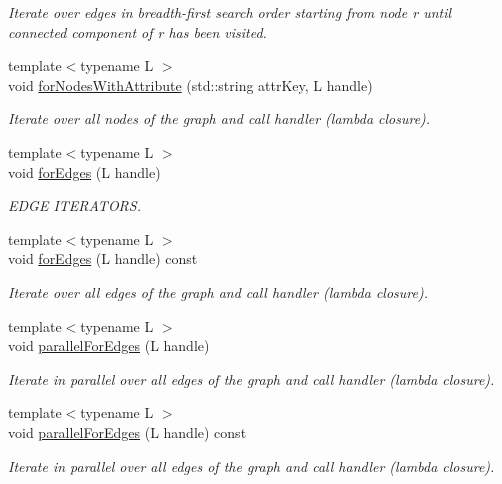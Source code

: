 \begin{DoxyCompactItemize}
\begin{DoxyCompactList}\small\item\em Iterate over edges in breadth-\/first search order starting from node r until connected component of r has been visited. \end{DoxyCompactList}\item 
{\footnotesize template$<$typename L $>$ }\\void \hyperlink{class_networ_kit_1_1_graph_ae182c231c108a4ff329f79e4eec28bc6}{for\-Nodes\-With\-Attribute} (std\-::string attr\-Key, L handle)
\begin{DoxyCompactList}\small\item\em Iterate over all nodes of the graph and call handler (lambda closure). \end{DoxyCompactList}\item 
{\footnotesize template$<$typename L $>$ }\\void \hyperlink{class_networ_kit_1_1_graph_a23a817e845887e6d2be9b42180448282}{for\-Edges} (L handle)
\begin{DoxyCompactList}\small\item\em E\-D\-G\-E I\-T\-E\-R\-A\-T\-O\-R\-S. \end{DoxyCompactList}\item 
{\footnotesize template$<$typename L $>$ }\\void \hyperlink{class_networ_kit_1_1_graph_a664cd528e003b9d530b9844412c9c243}{for\-Edges} (L handle) const 
\begin{DoxyCompactList}\small\item\em Iterate over all edges of the graph and call handler (lambda closure). \end{DoxyCompactList}\item 
{\footnotesize template$<$typename L $>$ }\\void \hyperlink{class_networ_kit_1_1_graph_a22c0e86e32fa99bb6f883bc63c42134a}{parallel\-For\-Edges} (L handle)
\begin{DoxyCompactList}\small\item\em Iterate in parallel over all edges of the graph and call handler (lambda closure). \end{DoxyCompactList}\item 
{\footnotesize template$<$typename L $>$ }\\void \hyperlink{class_networ_kit_1_1_graph_a107e9f9e74bee51de04b20fd8577db48}{parallel\-For\-Edges} (L handle) const 
\begin{DoxyCompactList}\small\item\em Iterate in parallel over all edges of the graph and call handler (lambda closure). \end{DoxyCompactList}\item 

\end{DoxyCompactItemize}
